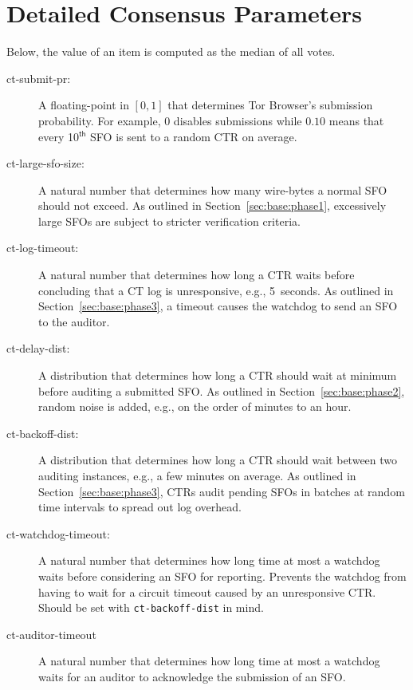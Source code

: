 \section{Detailed Consensus Parameters} \label{app:consensus-params} 

Below, the value of an item is computed as the median of all votes.
\begin{description}
    \item[ct-submit-pr:] A floating-point in $[0,1]$ that determines Tor
        Browser's submission probability.  For example, $0$ disables submissions
        while $0.10$ means that every 10$^{\mathsf{th}}$ SFO is sent to a random
        CTR on average.
    \item[ct-large-sfo-size:] A natural number that determines how many
        wire-bytes a normal SFO should not exceed.  As outlined in
        Section~\ref{sec:base:phase1}, excessively large SFOs are subject to
        stricter verification criteria.
    \item[ct-log-timeout:] A natural number that determines how long a CTR waits
        before concluding that a CT log is unresponsive, e.g., 5~seconds. As
        outlined in Section~\ref{sec:base:phase3}, a timeout causes the watchdog
        to send an SFO to the auditor.
    \item[ct-delay-dist:] A distribution that determines how long a CTR should
        wait at minimum before auditing a submitted SFO.  As outlined in
        Section~\ref{sec:base:phase2}, random noise is added, e.g., on the order
        of minutes to an hour.
    \item[ct-backoff-dist:]
        A distribution that determines how long a CTR should wait between two
        auditing instances, e.g., a few minutes on average.  As outlined in
        Section~\ref{sec:base:phase3}, CTRs audit pending SFOs in batches at
        random time intervals to spread out log overhead.
    \item[ct-watchdog-timeout:] A natural number that determines how long time
    at most a watchdog waits before considering an SFO for reporting. Prevents
    the watchdog from having to wait for a circuit timeout caused by an
    unresponsive CTR. Should be set with \texttt{ct-backoff-dist} in mind.
    \item[ct-auditor-timeout] A natural number that determines how long time at
    most a watchdog waits for an auditor to acknowledge the submission of an SFO.
\end{description}

